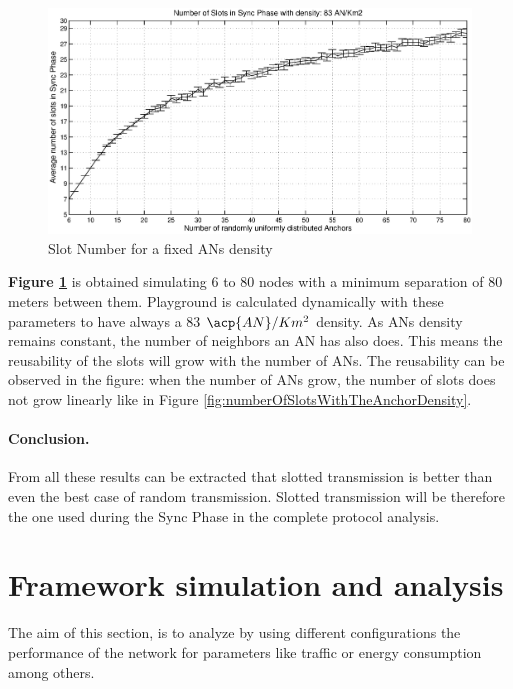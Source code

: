 \begin{figure}[ht]
 \begin{center}
  \includegraphics[width=1\textwidth]{numberOfSlotsWithTheSameDensity.eps}
 \end{center}
 \caption{Slot Number for a fixed \acp{AN} density}
 \label{fig:numberOfSlotsWithTheSameDensity}
\end{figure}

\textbf{Figure \ref{fig:numberOfSlotsWithTheSameDensity}} is obtained simulating 6 to 80 nodes with a minimum separation of 80 meters between 
them. Playground is calculated dynamically with these parameters to have always a 83 $\acp{AN}/Km^2$ density. As \acp{AN} density remains constant,
the number of neighbors an \ac{AN} has also does. This means the reusability of the slots will grow with the number of \acp{AN}. The reusability can be
observed in the figure: when the number of \acp{AN} grow, the number of slots does not grow linearly like in Figure \ref{fig:numberOfSlotsWithTheAnchorDensity}.

\paragraph{Conclusion.} From all these results can be extracted that slotted transmission is better than even the best case of random transmission. 
Slotted transmission will be therefore the one used during the Sync Phase in the complete protocol analysis.

\section{Framework simulation and analysis}

The aim of this section, is to analyze by using different configurations the performance of the network for parameters like traffic or energy 
consumption among others.

